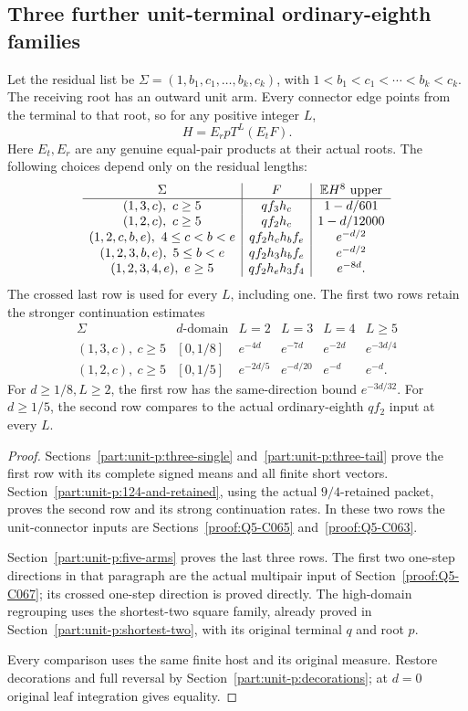 \subsection{Three further unit-terminal ordinary-eighth families}
\label{proof:Q5-C098}
Let the residual list be
\(\Sigma=(1,b_1,c_1,\ldots,b_k,c_k)\), with
\(1<b_1<c_1<\cdots<b_k<c_k\). The receiving root has an
outward unit arm. Every connector edge points from the terminal
to that root, so for any positive integer \(L\),
\begin{equation}\tag{Q98.0.1}\label{eq:Q98:0.1}
 H=E_rpT^L(E_tF).
\end{equation}
Here \(E_t,E_r\) are any genuine equal-pair products at their
actual roots. The following choices depend only on the residual
lengths:
\[
\begin{array}{c|c|c}
\Sigma&F&\mathbb E H^8\text{ upper}\\\hline
(1,3,c),\ c\ge5&qf_3h_c&1-d/601\\
(1,2,c),\ c\ge5&qf_2h_c&1-d/12000\\
(1,2,c,b,e),\ 4\le c<b<e&qf_2h_ch_bf_e&e^{-d/2}\\
(1,2,3,b,e),\ 5\le b<e&qf_2h_3h_bf_e&e^{-d/2}\\
(1,2,3,4,e),\ e\ge5&qf_2h_eh_3f_4&e^{-8d}.
\end{array}
\]
The crossed last row is used for every \(L\), including one.
The first two rows retain the stronger continuation estimates
\[
\begin{array}{c|c|c|c|c|c}
\Sigma&d\text{-domain}&L=2&L=3&L=4&L\ge5\\\hline
(1,3,c),\ c\ge5 &[0,1/8]&e^{-4d}&e^{-7d}&e^{-2d}&e^{-3d/4}\\
(1,2,c),\ c\ge5 &[0,1/5]&e^{-2d/5}&e^{-d/20}&e^{-d}&e^{-d}.
\end{array}
\]
For \(d\ge1/8,L\ge2\), the first row has the same-direction
bound \(e^{-3d/32}\). For \(d\ge1/5\), the second row compares
to the actual ordinary-eighth \(qf_2\) input at every \(L\).

\begin{proof}
Sections~\ref{part:unit-p:three-single}
and~\ref{part:unit-p:three-tail} prove the first row with its
complete signed means and all finite short vectors.
Section~\ref{part:unit-p:124-and-retained}, using the actual
\(9/4\)-retained packet, proves the second row and its strong
continuation rates. In these two rows the unit-connector inputs
are Sections~\ref{proof:Q5-C065} and~\ref{proof:Q5-C063}.

Section~\ref{part:unit-p:five-arms} proves the last three rows.
The first two one-step directions in that paragraph are the
actual multipair input of Section~\ref{proof:Q5-C067}; its
crossed one-step direction is proved directly. The high-domain
regrouping uses the shortest-two square family, already proved
in Section~\ref{part:unit-p:shortest-two}, with its original
terminal \(q\) and root \(p\).

Every comparison uses the same finite host and its original
measure. Restore decorations and full reversal by
Section~\ref{part:unit-p:decorations}; at \(d=0\) original
leaf integration gives equality.
\end{proof}
